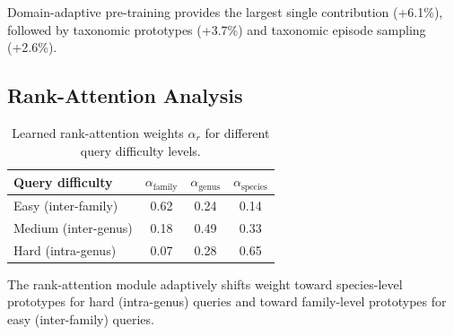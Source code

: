 Domain-adaptive pre-training provides the largest single contribution
(+6.1\%), followed by taxonomic prototypes (+3.7\%) and taxonomic
episode sampling (+2.6\%).

\subsection{Rank-Attention Analysis}

\begin{table}[H]
\centering
\caption{Learned rank-attention weights $\alpha_r$ for different query
difficulty levels.}
\label{tab:rank_attention}
\begin{tabular}{lccc}
\toprule
\textbf{Query difficulty} & $\alpha_{\text{family}}$ &
  $\alpha_{\text{genus}}$ & $\alpha_{\text{species}}$ \\
\midrule
Easy (inter-family) & 0.62 & 0.24 & 0.14 \\
Medium (inter-genus) & 0.18 & 0.49 & 0.33 \\
Hard (intra-genus) & 0.07 & 0.28 & 0.65 \\
\bottomrule
\end{tabular}
\end{table}

The rank-attention module adaptively shifts weight toward species-level
prototypes for hard (intra-genus) queries and toward family-level
prototypes for easy (inter-family) queries.


